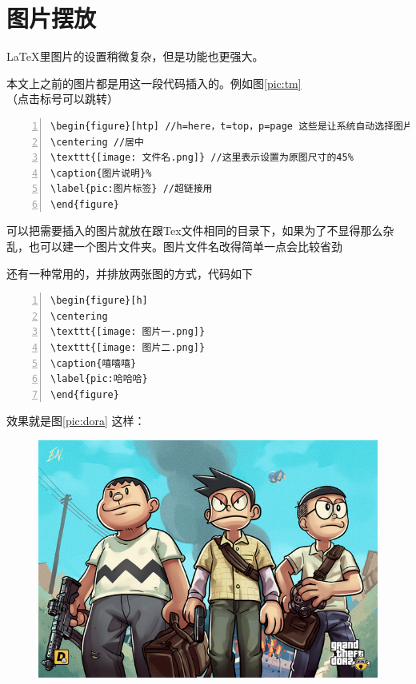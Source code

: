 \documentclass[12pt,a4paper,oneside]{book}
\begin{document}
{\section{图片摆放}
\LaTeX 里图片的设置稍微复杂，但是功能也更强大。
\par
本文上之前的图片都是用这一段代码插入的。例如图\ref{pic:tm}（点击标号可以跳转）
\par
\begin{lstlisting}[language={[ANSI]C}, numbers=left, numberstyle=\tiny, keywordstyle=\color{blue!70},  frame=shadowbox, rulesepcolor=\color{red!20!green!20!blue!20}]
\begin{figure}[htp] //h=here，t=top，p=page 这些是让系统自动选择图片最合适的位置
\centering //居中
\texttt{[image: 文件名.png]} //这里表示设置为原图尺寸的45%
\caption{图片说明}% 
\label{pic:图片标签} //超链接用
\end{figure}
\end{lstlisting}
\par
可以把需要插入的图片就放在跟Tex文件相同的目录下，如果为了不显得那么杂乱，也可以建一个图片文件夹。图片文件名改得简单一点会比较省劲~
\par
还有一种常用的，并排放两张图的方式，代码如下~
\par
\begin{lstlisting}[language={[ANSI]C}, numbers=left, numberstyle=\tiny, keywordstyle=\color{blue!70},  frame=shadowbox, rulesepcolor=\color{red!20!green!20!blue!20}]
\begin{figure}[h]
\centering
\texttt{[image: 图片一.png]}
\texttt{[image: 图片二.png]}
\caption{嘻嘻嘻}
\label{pic:哈哈哈}
\end{figure}
\end{lstlisting}
\par
效果就是图\ref{pic:dora} 这样：
\par
\begin{figure}[h]
\centering
\includegraphics[scale=0.21]{Figures/tr.png}

\end{figure}}
\end{document}
